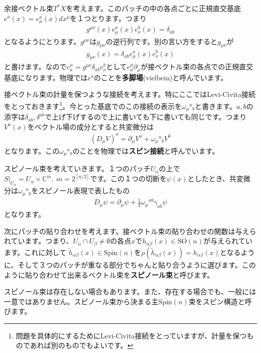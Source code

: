 \documentclass[paper=a4, fontsize=12pt, line_length=16cm, number_of_lines=33,dvipdfmx]{jlreq}
\numberwithin{equation}{section}
\newcommand{\del}{\partial}
\newcommand{\Cb}{\mathbb{C}}
\newcommand{\strong}[1]{\textsf{\bfseries #1}}
\newcommand{\htl}{\tilde{h}}
\newcommand{\SO}{\mathrm{SO}}
\newcommand{\Spin}{\mathrm{Spin}}
\begin{document}
余接ベクトル束$T^{*}X$を考えます。このパッチの中の各点ごとに正規直交基底$e^{a}(x)=e^{a}_{\mu}(x)dx^{\mu}$を１つとります。つまり
\begin{align}
  g^{\mu\nu}(x)e^{a}_{\mu}(x)e^{b}_{\nu}(x)=\delta_{ab}
\end{align}
となるようにとります。$g^{\mu\nu}$は$g_{\mu\nu}$の逆行列です。別の言い方をすると$g_{\mu\nu}$が
\begin{align}
  g_{\mu\nu}(x)=\delta_{ab}e^{a}_{\mu}(x)e^{b}_{\nu}(x)
\end{align}
と書けます。なので$e^{\mu}_{a}=g^{\mu\nu}\delta_{ab}e^{b}_{\nu}$として$e_{a}^{\mu}\del_{\mu}$が接ベクトル束の各点での正規直交基底になります。物理では$e^{a}$のことを\strong{多脚場}(vielbein)と呼んでいます。

接ベクトル束の計量を保つような接続を考えます。特にここではLevi-Civita接続をとっておきます\footnote{問題を具体的にするためにLevi-Civita接続をとっていますが、計量を保つものであれば別のものでもよいです。}。今とった基底でのこの接続の表示を$\omega_{\mu}{}^{a}{}_{b}$と書きます。$a,b$の添字は$\delta_{ab},\delta^{ab}$で上げ下げするので上に書いても下に書いても同じです。つまり$V^a(x)$をベクトル場の成分とすると共変微分は
\begin{align}
  (D_{\mu}V)^a=\del_{\mu}V^{a}+\omega_{\mu}{}^{a}{}_{b}V^b
\end{align}
となります。この$\omega_{\mu}{}^{a}{}_{b}$のことを物理では\strong{スピン接続}と呼んでいます。

スピノール束を考えていきます。１つのパッチ$U_{\alpha}$の上で$S|_{U_{\alpha}}=U_{\alpha}\times \Cb^{m},\ m=2^{[n/2]}$です。この１つの切断を$\psi(x)$としたとき、共変微分は$\omega_{\mu}{}^{a}{}_{b}$をスピノール表現で表したもの
\begin{align}
  D_{\mu}\psi=\del_{\mu}\psi+\frac14\omega_{\mu}{}^{ab}\gamma_{ab}\psi
\end{align}
となります。

次にパッチの貼り合わせを考えます。接ベクトル束の貼り合わせの関数は与えられています。つまり、$U_{\alpha}\cap U_{\beta}\ne \emptyset$の各点$x$で$h_{\alpha\beta}(x)\in \SO(n)$が与えられています。これに対して
$\htl_{\alpha\beta}(x)\in \Spin(n)$を$\rho(\htl_{\alpha\beta}(x))=h_{\alpha\beta}(x)$となるように、そして３つのパッチが重なる部分でちゃんと貼り合うように選びます。このように貼り合わせて出来るベクトル束を\strong{スピノール束}と呼びます。

スピノール束は存在しない場合もあります。また、存在する場合でも、一般には一意ではありません。スピノール束から決まる主$\Spin(n)$束をスピン構造と呼びます。
\end{document}
